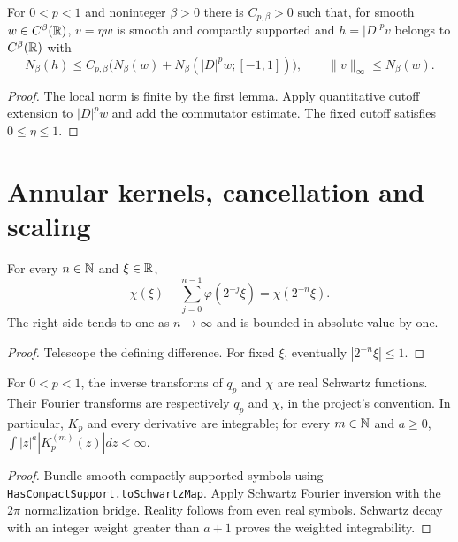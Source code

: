 \begin{lemma}
  \label{lem:c12_localized_rhs}
  For $0<p<1$ and noninteger $\beta>0$ there is $C_{p,\beta}>0$ such that, for
  smooth $w\in C^\beta(\mathbb{R})$, $v=\eta w$ is smooth and compactly supported and
  $h=|D|^pv$ belongs to $C^\beta(\mathbb{R})$ with
  \[
    N_\beta(h)\le C_{p,\beta}\bigl(N_\beta(w)+N_\beta(|D|^pw;[-1,1])\bigr),
    \qquad \|v\|_\infty\le N_\beta(w).
  \]
\end{lemma}
\begin{proof}
  The local norm is finite by the first lemma. Apply quantitative cutoff extension to
  $|D|^pw$ and add the commutator estimate. The fixed cutoff satisfies $0\le\eta\le1$.
\end{proof}

\section{Annular kernels, cancellation and scaling}

\begin{lemma}
  \label{lem:c12_dyadic_telescope}
  For every $n\in\mathbb{N}$ and $\xi\in\mathbb{R}$,
  \[
    \chi(\xi)+\sum_{j=0}^{n-1}\varphi(2^{-j}\xi)=\chi(2^{-n}\xi).
  \]
  The right side tends to one as $n\to\infty$ and is bounded in absolute value by one.
\end{lemma}
\begin{proof}
  Telescope the defining difference. For fixed $\xi$, eventually $|2^{-n}\xi|\le1$.
\end{proof}

\begin{lemma}
  \label{lem:c12_kernel_schwartz}
  For $0<p<1$, the inverse transforms of $q_p$ and $\chi$ are real Schwartz functions.
  Their Fourier transforms are respectively $q_p$ and $\chi$, in the project's convention.
  In particular, $K_p$ and every derivative are integrable; for every $m\in\mathbb{N}$ and $a\ge0$,
  $\int|z|^a|K_p^{(m)}(z)|dz<\infty$.
\end{lemma}
\begin{proof}
  Bundle smooth compactly supported symbols using \texttt{HasCompactSupport.toSchwartzMap}.
  Apply Schwartz Fourier inversion with the $2\pi$ normalization bridge.
  Reality follows from even real symbols. Schwartz decay with an integer weight greater than
  $a+1$ proves the weighted integrability.
\end{proof}

